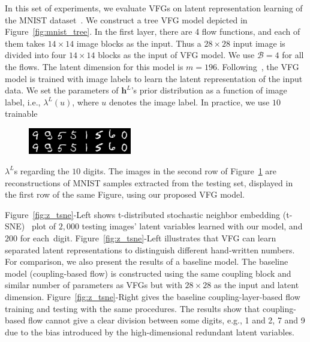 \documentclass[sigconf, anonymous, review]{acmart}
\theoremstyle{plain}
\theoremstyle{definition}
\theoremstyle{remark}
\begin{document}
In this set of experiments, we evaluate VFGs on latent representation learning of the MNIST dataset~\cite{Lecunmnist2010}. We construct a tree  VFG model depicted in Figure~\ref{fig:mnist_tree}.  
In the first layer, there are 4 flow functions, and each of them takes $14\times 14$ image blocks as the input. 
Thus a $28\times 28$ input image is divided into four $14\times 14$ blocks as the input of VFG model. We use $\mathcal{B}=4$ for all the flows.
The latent dimension for this model is $m=196$. 
Following~\cite{Sorrenson2020}, the VFG model is trained with image labels to learn the latent representation of the input data. We set the parameters of $\mathbf{h}^L$'s prior distribution as a function of image label, i.e., $\lambda^L(u)$, where $u$ denotes the image label. In practice, we use $10$ trainable
\begin{figure}[h]
    \vspace{-0.1in}
    \centering
       \includegraphics[width=0.4\textwidth]{fig/reconst_Y.png}
    \label{fig:reconst}
\end{figure}
$\lambda^L$s regarding the $10$ digits. 
The images in the second row of 
Figure~\ref{fig:reconst} are reconstructions of MNIST samples extracted from the testing set, displayed in the first row of the same Figure, using our proposed VFG model.  








Figure~\ref{fig:z_tsne}-Left shows  t-distributed stochastic neighbor embedding (t-SNE)~\cite{maaten2008visualizing} plot of $2,000$ testing images' latent variables learned with our model, and $200$ for each~digit. 
Figure~\ref{fig:z_tsne}-Left illustrates that VFG can learn separated latent representations to distinguish different hand-written numbers. For comparison, we also present the results of a baseline model. The baseline model (coupling-based flow) is constructed using the same coupling block and similar number of parameters as VFGs but with $28\times 28$ as the input and latent dimension.  Figure~\ref{fig:z_tsne}-Right gives the baseline  coupling-layer-based flow  training and testing with the same procedures. The results show that coupling-based flow cannot  give a clear division between some digits, e.g., 1 and 2, 7 and 9  due to the bias introduced by the high-dimensional redundant latent variables. 
\end{document}
